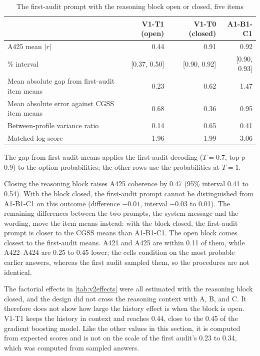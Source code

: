 \documentclass[11pt]{article}
\begin{document}
\begin{table}[H]
\centering
\caption{The first-audit prompt with the reasoning block open or closed, five items}
\label{tab:v1cells}
\small
\begin{tabular}{lrrr}
\toprule
 & V1-T1 (open) & V1-T0 (closed) & A1-B1-C1 \\
\midrule
A425 mean $|r|$ & 0.44 & 0.91 & 0.92 \\
\quad 95\% interval & [0.37, 0.50] & [0.90, 0.92] & [0.90, 0.93] \\
Mean absolute gap from first-audit item means & 0.23 & 0.62 & 1.47 \\
Mean absolute error against CGSS item means & 0.68 & 0.36 & 0.95 \\
Between-profile variance ratio & 0.14 & 0.65 & 0.41 \\
Matched log score & 1.96 & 1.99 & 3.06 \\
\bottomrule
\end{tabular}
\begin{tablenotes}\footnotesize
\item The gap from first-audit means applies the first-audit decoding ($T=0.7$, top-$p$ 0.9) to the option probabilities; the other rows use the probabilities at $T=1$.
\end{tablenotes}
\end{table}

Closing the reasoning block raises A425 coherence by 0.47 (95\% interval 0.41 to 0.54). With the block closed, the first-audit prompt cannot be distinguished from A1-B1-C1 on this outcome (difference $-0.01$, interval $-0.03$ to 0.01). The remaining differences between the two prompts, the system message and the wording, move the item means instead: with the block closed, the first-audit prompt is closer to the CGSS means than A1-B1-C1. The open block comes closest to the first-audit means. A421 and A425 are within 0.11 of them, while A422--A424 are 0.25 to 0.45 lower; the cells condition on the most probable earlier answers, whereas the first audit sampled them, so the procedures are not identical.

The factorial effects in \cref{tab:v2effects} were all estimated with the reasoning block closed, and the design did not cross the reasoning context with A, B, and C. It therefore does not show how large the history effect is when the block is open. V1-T1 keeps the history in context and reaches 0.44, close to the 0.45 of the gradient boosting model. Like the other values in this section, it is computed from expected scores and is not on the scale of the first audit's 0.23 to 0.34, which was computed from sampled answers.
\end{document}

